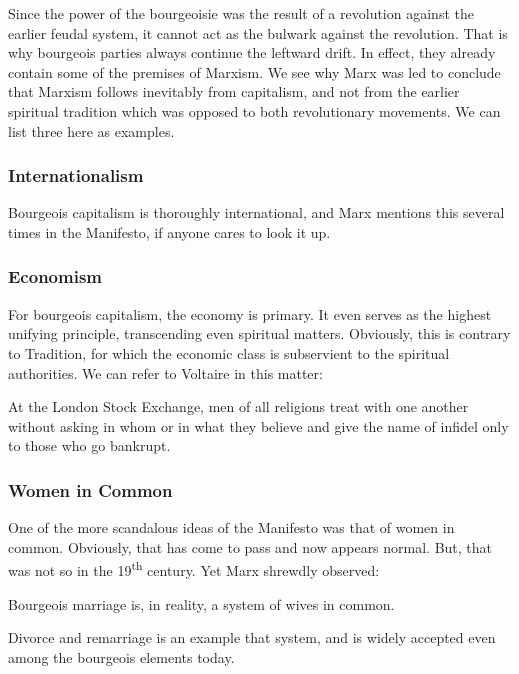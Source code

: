 Since the power of the bourgeoisie was the result of a revolution against the earlier feudal system, it cannot act as the bulwark against the revolution. That is why bourgeois parties always continue the leftward drift. In effect, they already contain some of the premises of Marxism. We see why Marx was led to conclude that Marxism follows inevitably from capitalism, and not from the earlier spiritual tradition which was opposed to both revolutionary movements. We can list three here as examples.

\subsubsection{Internationalism}


Bourgeois capitalism is thoroughly international, and Marx mentions this several times in the Manifesto, if anyone cares to look it up.

\subsubsection{Economism}


For bourgeois capitalism, the economy is primary. It even serves as the highest unifying principle, transcending even spiritual matters. Obviously, this is contrary to Tradition, for which the economic class is subservient to the spiritual authorities. We can refer to Voltaire in this matter:

\begin{quotex} 
At the London Stock Exchange, men of all religions treat with one another without asking in whom or in what they believe and give the name of infidel only to those who go bankrupt.
\end{quotex}


\subsubsection{Women in Common}


One of the more scandalous ideas of the Manifesto was that of women in common. Obviously, that has come to pass and now appears normal. But, that was not so in the 19\textsuperscript{th} century. Yet Marx shrewdly observed:

\begin{quotex}
Bourgeois marriage is, in reality, a system of wives in common.
\end{quotex}


Divorce and remarriage is an example that system, and is widely accepted even among the bourgeois elements today.

